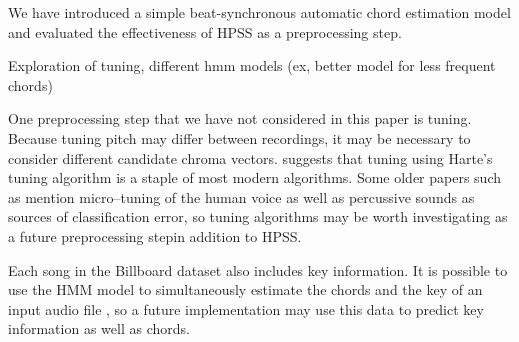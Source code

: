 \documentclass{article}
\begin{document}
We have introduced a simple beat-synchronous automatic chord estimation model
and evaluated the effectiveness of HPSS as a preprocessing step.

Exploration of tuning, different hmm models (ex, better model for less frequent chords)

One preprocessing step that we have not considered in this paper is tuning. Because tuning pitch 
may differ between recordings, it may be necessary to consider different candidate chroma vectors. 
\cite{McVicar:00} suggests that tuning using Harte's tuning algorithm is a staple of most modern
algorithms. Some older papers such as \cite{Zenz:20} mention micro--tuning of the human voice as well 
as percussive sounds as sources of classification error, so tuning algorithms may be worth investigating 
as a future preprocessing stepin addition to HPSS. 

Each song in the Billboard dataset also includes key information. It is possible to use the HMM model to 
simultaneously estimate the chords and the key of an input audio file \cite{McVicar:00}, so a future
implementation may use this data to predict key information as well as chords.
\end{document}
